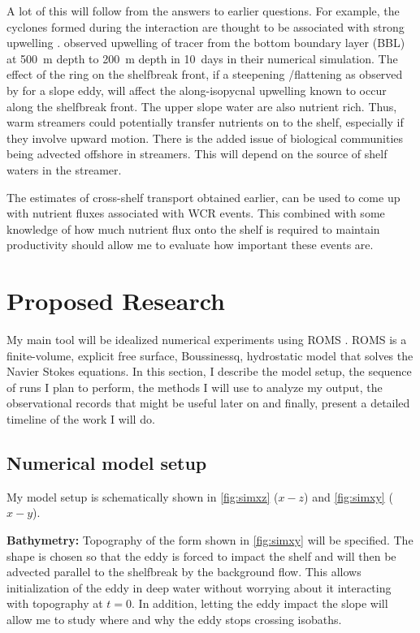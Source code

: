 
A lot of this will follow from the answers to earlier questions. For example, the cyclones formed during the interaction are thought to be associated with strong upwelling \citep{Wei2009}. \cite{Oey2004} observed upwelling of tracer from the bottom boundary layer (BBL) at \SI{500}{\m} depth to \SI{200}{m} depth in \SI{10}{days} in their numerical simulation. The effect of the ring on the shelfbreak front, if a steepening /flattening as observed by \cite{Gawarkiewicz2001} for a slope eddy, will affect the along-isopycnal upwelling known to occur along the shelfbreak front. The upper slope water are also nutrient rich. Thus, warm streamers could potentially transfer nutrients on to the shelf, especially if they involve upward motion. There is the added issue of biological communities being advected offshore in streamers. This will depend on the source of shelf waters in the streamer. 

The estimates of cross-shelf transport obtained earlier, can be used to come up with nutrient fluxes associated with WCR events. This combined with some knowledge of how much nutrient flux onto the shelf is required to maintain productivity should allow me to evaluate how important these events are.

\section{Proposed Research}

My main tool will be idealized numerical experiments using ROMS \citep{Shchepetkin2005}. ROMS is a finite-volume, explicit free surface, Boussinessq, hydrostatic model that solves the Navier Stokes equations. In this section, I describe the model setup, the sequence of runs I plan to perform, the methods I will use to analyze my output, the observational records that might be useful later on and finally, present a detailed timeline of the work I will do.

\subsection{Numerical model setup}

My model setup is schematically shown in \cref{fig:simxz} ($x-z$) and \cref{fig:simxy} ($x-y$).

\textbf{Bathymetry: }Topography of the form shown in \cref{fig:simxy} will be specified. The shape is chosen so that the eddy is forced to impact the shelf and will then be advected parallel to the shelfbreak by the background flow. This allows initialization of the eddy in deep water without worrying about it interacting with topography at $t=0$. In addition, letting the eddy impact the slope will allow me to study where and why the eddy stops crossing isobaths.

